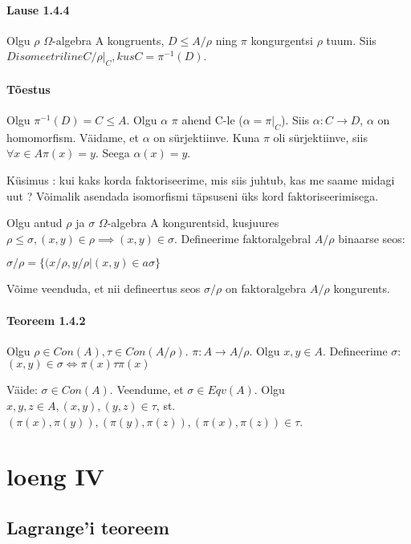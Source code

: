 \documentclass[12pt]{report}
\numberwithin{equation}{section}
\theoremstyle{definition}
\theoremstyle{plain}
\begin{document}
\paragraph{Lause 1.4.4} Olgu $\rho$ $\Omega $-algebra A kongruents, $D \leq A / \rho$ ning $\pi $ kongurgentsi $\rho $ tuum. Siis $D isomeetriline C / \rho|_C , kus C = \pi^{-1}(D) $.

\paragraph*{Tõestus}

Olgu $\pi^{-1}(D) = C \leq A$. Olgu $\alpha$ $\pi$ ahend C-le ($\alpha = \pi|_{C}$). Siis $\alpha : C \rightarrow D$, $\alpha$ on homomorfism. Väidame, et $\alpha$ on s\"urjektiinve. Kuna $\pi$ oli s\"urjektiinve, siis $\forall x \in A \pi(x) = y$. Seega $\alpha(x) = y$. 

K\"usimus : kui kaks korda faktoriseerime, mis siis juhtub, kas me saame midagi uut ? Võimalik asendada isomorfismi täpsuseni üks kord faktoriseerimisega. 

Olgu antud $\rho$ ja $\sigma$ $\Omega$-algebra A kongurentsid, kusjuures $\rho \leq \sigma, (x,y) \in \rho \implies (x,y) \in \sigma$. Defineerime faktoralgebral $A/ \rho$ binaarse seos:

$\sigma / \rho = \{(x / \rho, y / \rho  | (x,y) \in a \sigma \}$

Võime veenduda, et nii defineertus seos $\sigma / \rho$ on faktoralgebra $A / \rho$ kongurents.

\paragraph{Teoreem 1.4.2}

Olgu $\rho \in Con(A), \tau \in Con(A / \rho)$. $\pi : A \rightarrow A / \rho$. Olgu $x,y \in A$.  Defineerime $\sigma$: $(x,y) \in \sigma \iff \pi(x) \tau \pi(x)$

Väide: $\sigma \in Con(A)$. Veendume, et $\sigma \in Eqv(A)$. Olgu $x,y,z \in A, (x,y), (y,z) \in \tau$, st. $(\pi(x),\pi(y)), (\pi(y),\pi(z)), (\pi(x),\pi(z)) \in \tau$.


\section{loeng IV}

\subsection{Lagrange'i teoreem}
\end{document}
